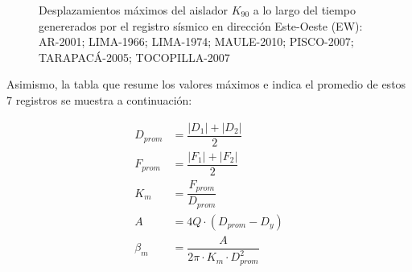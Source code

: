 \begin{figure}[H]
\begin{subfigure}[b]{0.99\linewidth}
  \caption{}
  \label{i4_2.7}
\end{subfigure}
    \caption[Desplazamientos máximos del aislador $K_{90}$ a lo largo del tiempo genererados por el registro sísmico en dirección Este-Oeste (EW)]{Desplazamientos máximos del aislador $K_{90}$ a lo largo del tiempo genererados por el registro sísmico en dirección Este-Oeste (EW):
     AR-2001;
     LIMA-1966;
     LIMA-1974;
     MAULE-2010;
     PISCO-2007;
     TARAPACÁ-2005;
     TOCOPILLA-2007
    }
    \label{i4_2}
\end{figure}

Asimismo, la tabla que resume los valores máximos e indica el promedio de estos 7 registros se muestra a continuación:

\begin{align*}
    D_{prom} &= \dfrac{|D_1| + |D_2|}{2} \\
    F_{prom} &= \dfrac{|F_1| + |F_2|}{2} \\
    K_m &= \dfrac{F_{prom}}{D_{prom}} \\
    A &= 4Q \cdot (D_{prom} - D_y) \\
    \beta_m &= \dfrac{A}{2\pi \cdot K_m \cdot D_{prom}^2}
\end{align*}

